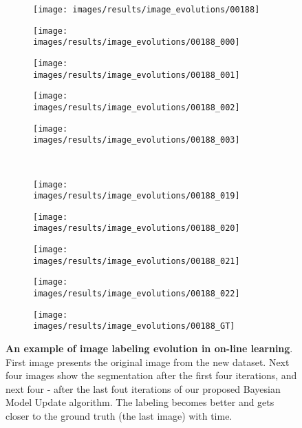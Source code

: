 \begin{figure}[t]
 \begin{subfigure}[c]{0.19\textwidth}
  \centering
  \texttt{[image: images/results/image\_evolutions/00188]}
 \end{subfigure}
 \begin{subfigure}[c]{0.19\textwidth}
  \centering
  \texttt{[image: images/results/image\_evolutions/00188\_000]}
 \end{subfigure}
 \begin{subfigure}[c]{0.19\textwidth}
  \centering
  \texttt{[image: images/results/image\_evolutions/00188\_001]}
 \end{subfigure}
 \begin{subfigure}[c]{0.19\textwidth}
  \centering
  \texttt{[image: images/results/image\_evolutions/00188\_002]}
 \end{subfigure}
 \begin{subfigure}[c]{0.19\textwidth}
  \centering
  \texttt{[image: images/results/image\_evolutions/00188\_003]}
 \end{subfigure}
 \\
 \begin{subfigure}[c]{0.19\textwidth}
  \centering
  \texttt{[image: images/results/image\_evolutions/00188\_019]}
 \end{subfigure}
 \begin{subfigure}[c]{0.19\textwidth}
  \centering
  \texttt{[image: images/results/image\_evolutions/00188\_020]}
 \end{subfigure}
 \begin{subfigure}[c]{0.19\textwidth}
  \centering
  \texttt{[image: images/results/image\_evolutions/00188\_021]}
 \end{subfigure}
 \begin{subfigure}[c]{0.19\textwidth}
  \centering
  \texttt{[image: images/results/image\_evolutions/00188\_022]}
 \end{subfigure}
 \begin{subfigure}[c]{0.19\textwidth}
  \centering
  \texttt{[image: images/results/image\_evolutions/00188\_GT]}
 \end{subfigure}
 
 \caption[An example of image labeling evolution in on-line learning]{
 {\bf An example of image labeling evolution in on-line learning}. 
 First image presents the original image from the new dataset. Next four images show the segmentation after the first four iterations, and next four - 
 after the last fout iterations of our proposed Bayesian Model Update algorithm. The labeling becomes better and gets closer to the ground truth (the last
 image) with time.}
 \label{fig:image_evolution_bayesian}
\end{figure}

